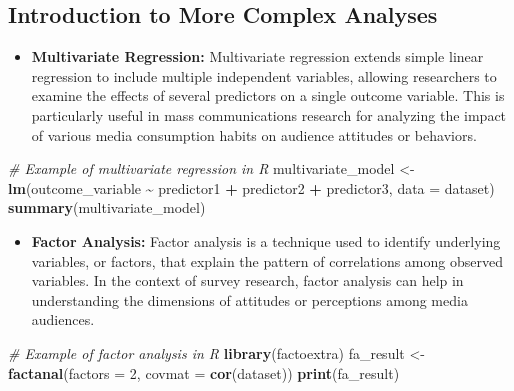\documentclass[
]{book}
\newenvironment{Shaded}{\begin{snugshade}}{\end{snugshade}}
\newcommand{\AttributeTok}[1]{\textcolor[rgb]{0.13,0.29,0.53}{#1}}
\newcommand{\CommentTok}[1]{\textcolor[rgb]{0.56,0.35,0.01}{\textit{#1}}}
\newcommand{\DecValTok}[1]{\textcolor[rgb]{0.00,0.00,0.81}{#1}}
\newcommand{\FunctionTok}[1]{\textcolor[rgb]{0.13,0.29,0.53}{\textbf{#1}}}
\newcommand{\NormalTok}[1]{#1}
\newcommand{\OtherTok}[1]{\textcolor[rgb]{0.56,0.35,0.01}{#1}}
\newcommand{\SpecialCharTok}[1]{\textcolor[rgb]{0.81,0.36,0.00}{\textbf{#1}}}
\providecommand{\tightlist}{%
  \setlength{\itemsep}{0pt}\setlength{\parskip}{0pt}}
\begin{document}
\hypertarget{introduction-to-more-complex-analyses}{%
\subsection*{Introduction to More Complex Analyses}\label{introduction-to-more-complex-analyses}}

\begin{itemize}
\tightlist
\item
  \textbf{Multivariate Regression:} Multivariate regression extends simple linear regression to include multiple independent variables, allowing researchers to examine the effects of several predictors on a single outcome variable. This is particularly useful in mass communications research for analyzing the impact of various media consumption habits on audience attitudes or behaviors.
\end{itemize}

\begin{Shaded}
\begin{Highlighting}[]
\CommentTok{\# Example of multivariate regression in R}
\NormalTok{multivariate\_model }\OtherTok{\textless{}{-}} \FunctionTok{lm}\NormalTok{(outcome\_variable }\SpecialCharTok{\textasciitilde{}}\NormalTok{ predictor1 }\SpecialCharTok{+}\NormalTok{ predictor2 }\SpecialCharTok{+}\NormalTok{ predictor3, }\AttributeTok{data =}\NormalTok{ dataset)}
\FunctionTok{summary}\NormalTok{(multivariate\_model)}
\end{Highlighting}
\end{Shaded}

\begin{itemize}
\tightlist
\item
  \textbf{Factor Analysis:} Factor analysis is a technique used to identify underlying variables, or factors, that explain the pattern of correlations among observed variables. In the context of survey research, factor analysis can help in understanding the dimensions of attitudes or perceptions among media audiences.
\end{itemize}

\begin{Shaded}
\begin{Highlighting}[]
\CommentTok{\# Example of factor analysis in R}
\FunctionTok{library}\NormalTok{(factoextra)}
\NormalTok{fa\_result }\OtherTok{\textless{}{-}} \FunctionTok{factanal}\NormalTok{(}\AttributeTok{factors =} \DecValTok{2}\NormalTok{, }\AttributeTok{covmat =} \FunctionTok{cor}\NormalTok{(dataset))}
\FunctionTok{print}\NormalTok{(fa\_result)}
\end{Highlighting}
\end{Shaded}
\end{document}
